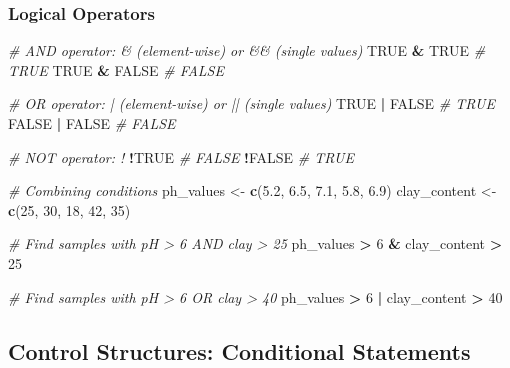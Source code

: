 \documentclass[
  10pt,
  b5paper,
  oneside]{book}
\newenvironment{Shaded}{\begin{snugshade}}{\end{snugshade}}
\newcommand{\CommentTok}[1]{\textcolor[rgb]{0.56,0.35,0.01}{\textit{#1}}}
\newcommand{\ConstantTok}[1]{\textcolor[rgb]{0.56,0.35,0.01}{#1}}
\newcommand{\DecValTok}[1]{\textcolor[rgb]{0.00,0.00,0.81}{#1}}
\newcommand{\FloatTok}[1]{\textcolor[rgb]{0.00,0.00,0.81}{#1}}
\newcommand{\FunctionTok}[1]{\textcolor[rgb]{0.13,0.29,0.53}{\textbf{#1}}}
\newcommand{\NormalTok}[1]{#1}
\newcommand{\OtherTok}[1]{\textcolor[rgb]{0.56,0.35,0.01}{#1}}
\newcommand{\SpecialCharTok}[1]{\textcolor[rgb]{0.81,0.36,0.00}{\textbf{#1}}}
\begin{document}
\subsubsection{Logical Operators}\label{logical-operators}

\begin{Shaded}
\begin{Highlighting}[]
\CommentTok{\# AND operator: \& (element{-}wise) or \&\& (single values)}
\ConstantTok{TRUE} \SpecialCharTok{\&} \ConstantTok{TRUE}      \CommentTok{\# TRUE}
\ConstantTok{TRUE} \SpecialCharTok{\&} \ConstantTok{FALSE}     \CommentTok{\# FALSE}

\CommentTok{\# OR operator: | (element{-}wise) or || (single values)}
\ConstantTok{TRUE} \SpecialCharTok{|} \ConstantTok{FALSE}     \CommentTok{\# TRUE}
\ConstantTok{FALSE} \SpecialCharTok{|} \ConstantTok{FALSE}    \CommentTok{\# FALSE}

\CommentTok{\# NOT operator: !}
\SpecialCharTok{!}\ConstantTok{TRUE}            \CommentTok{\# FALSE}
\SpecialCharTok{!}\ConstantTok{FALSE}           \CommentTok{\# TRUE}

\CommentTok{\# Combining conditions}
\NormalTok{ph\_values }\OtherTok{\textless{}{-}} \FunctionTok{c}\NormalTok{(}\FloatTok{5.2}\NormalTok{, }\FloatTok{6.5}\NormalTok{, }\FloatTok{7.1}\NormalTok{, }\FloatTok{5.8}\NormalTok{, }\FloatTok{6.9}\NormalTok{)}
\NormalTok{clay\_content }\OtherTok{\textless{}{-}} \FunctionTok{c}\NormalTok{(}\DecValTok{25}\NormalTok{, }\DecValTok{30}\NormalTok{, }\DecValTok{18}\NormalTok{, }\DecValTok{42}\NormalTok{, }\DecValTok{35}\NormalTok{)}

\CommentTok{\# Find samples with pH \textgreater{} 6 AND clay \textgreater{} 25}
\NormalTok{ph\_values }\SpecialCharTok{\textgreater{}} \DecValTok{6} \SpecialCharTok{\&}\NormalTok{ clay\_content }\SpecialCharTok{\textgreater{}} \DecValTok{25}

\CommentTok{\# Find samples with pH \textgreater{} 6 OR clay \textgreater{} 40}
\NormalTok{ph\_values }\SpecialCharTok{\textgreater{}} \DecValTok{6} \SpecialCharTok{|}\NormalTok{ clay\_content }\SpecialCharTok{\textgreater{}} \DecValTok{40}
\end{Highlighting}
\end{Shaded}

\subsection{Control Structures: Conditional Statements}\label{conditional-statements}
\end{document}
